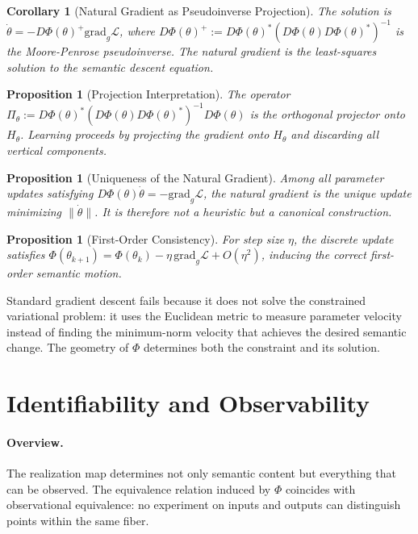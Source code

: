 \documentclass[twocolumn,10pt]{article}
\theoremstyle{thmstyle}
\newtheorem{corollary}[theorem]{Corollary}
\newtheorem{proposition}[theorem]{Proposition}
\theoremstyle{defstyle}
\begin{document}
\begin{corollary}[Natural Gradient as Pseudoinverse Projection]
The solution is $\dot\theta = -D\Phi(\theta)^+\mathrm{grad}_g\mathcal{L}$,
where $D\Phi(\theta)^+ := D\Phi(\theta)^*(D\Phi(\theta)D\Phi(\theta)^*)^{-1}$
is the Moore-Penrose pseudoinverse. The natural gradient is the
least-squares solution to the semantic descent equation.
\end{corollary}

\begin{proposition}[Projection Interpretation]
The operator $\Pi_\theta := D\Phi(\theta)^*(D\Phi(\theta)D\Phi(\theta)^*)^{-1}
D\Phi(\theta)$ is the orthogonal projector onto $H_\theta$. Learning
proceeds by projecting the gradient onto $H_\theta$ and discarding all
vertical components.
\end{proposition}

\begin{proposition}[Uniqueness of the Natural Gradient]
Among all parameter updates satisfying
$D\Phi(\theta)\dot\theta = -\mathrm{grad}_g\mathcal{L}$, the natural
gradient is the unique update minimizing $\|\dot\theta\|$. It is
therefore not a heuristic but a canonical construction.
\end{proposition}

\begin{proposition}[First-Order Consistency]
For step size $\eta$, the discrete update satisfies
$\Phi(\theta_{k+1}) = \Phi(\theta_k) - \eta\,\mathrm{grad}_g\mathcal{L}
+ O(\eta^2)$, inducing the correct first-order semantic motion.
\end{proposition}

Standard gradient descent fails because it does not solve the
constrained variational problem: it uses the Euclidean metric to measure
parameter velocity instead of finding the minimum-norm velocity that
achieves the desired semantic change. The geometry of $\Phi$ determines
both the constraint and its solution.

\section{Identifiability and Observability}
\label{sec:identifiability}

\paragraph{Overview.}
The realization map determines not only semantic content but everything
that can be observed. The equivalence relation induced by $\Phi$
coincides with observational equivalence: no experiment on inputs and
outputs can distinguish points within the same fiber.
\end{document}
